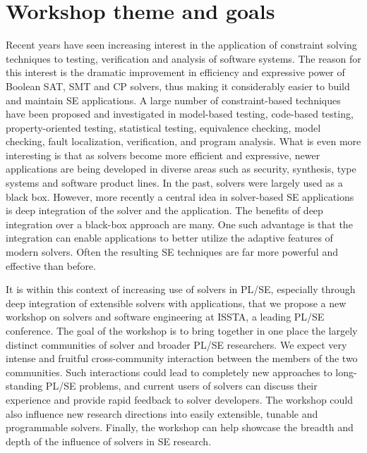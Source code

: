 \documentclass{sig-alternate}
\begin{document}
\section{Workshop theme and goals}
\vspace{0.2cm} Recent years have seen increasing interest in the
application of constraint solving techniques to testing, verification
and analysis of software systems. The reason for this interest is the
dramatic improvement in efficiency and expressive power of Boolean
SAT, SMT and CP solvers, thus making it considerably easier to build
and maintain SE applications. A large
number of constraint-based techniques have been proposed and
investigated in model-based testing, code-based testing,
property-oriented testing, statistical testing, equivalence checking,
model checking, fault localization, verification, and program
analysis.  What is even more interesting is that as solvers become
more efficient and expressive, newer applications are being developed
in diverse areas such as security, synthesis, type systems and
software product lines. In the past, solvers were largely used as
a black box. However, more recently a central idea in solver-based SE
applications is deep integration of the solver and the application. The
benefits of deep integration over a black-box approach are many. One such advantage is that the integration can enable
applications to better utilize the adaptive features of modern
solvers. Often the resulting SE techniques are far more powerful and
effective than before.

\vspace{0.2cm} It is within this context of increasing use of solvers
in PL/SE, especially through deep integration of extensible solvers with
applications, that we propose a new workshop on solvers and software
engineering at ISSTA, a leading PL/SE conference. The goal of the
workshop is to bring together in one place the largely distinct
communities of solver and broader PL/SE researchers. We expect very
intense and fruitful cross-community interaction between the members
of the two communities. Such interactions could lead to completely new
approaches to long-standing PL/SE problems, and current users of solvers
can discuss their experience and provide rapid feedback to solver
developers. The workshop could also influence new research directions
into easily extensible, tunable and programmable solvers. Finally, the
workshop can help showcase the breadth and depth of the influence of
solvers in SE research.
\end{document}

